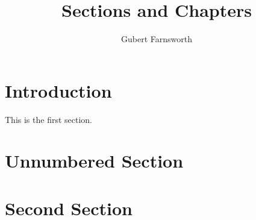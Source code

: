 \documentclass{article}
\title{Sections and Chapters}
\author{Gubert Farnsworth}
\date{ }
\begin{document}
\maketitle

\tableofcontents

\section{Introduction}

This is the first section.

\blindtext

\section*{Unnumbered Section}

\blindtext

\section{Second Section}

\blindtext
\end{document}
